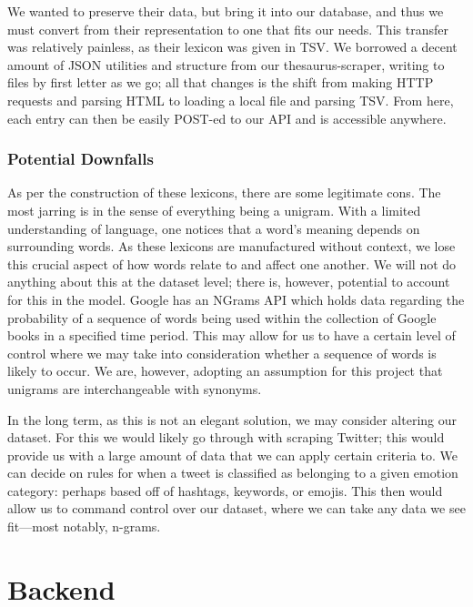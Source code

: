 \documentclass[11pt, twoside, reqno]{book}
\begin{document}
We wanted to preserve their data, but bring it into our database, and thus we must convert from their representation to one that fits our needs. This transfer was relatively painless, as their lexicon was given in TSV. We borrowed a decent amount of JSON utilities and structure from our thesaurus-scraper, writing to files by first letter as we go; all that changes is the shift from making HTTP requests and parsing HTML to loading a local file and parsing TSV. From here, each entry can then be easily POST-ed to our API and is accessible anywhere.

\subsection{Potential Downfalls}

As per the construction of these lexicons, there are some legitimate cons. The most jarring is in the sense of everything being a unigram. With a limited understanding of language, one notices that a word's meaning depends on surrounding words. As these lexicons are manufactured without context, we lose this crucial aspect of how words relate to and affect one another. We will not do anything about this at the dataset level; there is, however, potential to account for this in the model. Google has an NGrams API which holds data regarding the probability of a sequence of words being used within the collection of Google books in a specified time period. This may allow for us to have a certain level of control where we may take into consideration whether a sequence of words is likely to occur. We are, however, adopting an assumption for this project that unigrams are interchangeable with synonyms.

In the long term, as this is not an elegant solution, we may consider altering our dataset. For this we would likely go through with scraping Twitter; this would provide us with a large amount of data that we can apply certain criteria to. We can decide on rules for when a tweet is classified as belonging to a given emotion category: perhaps based off of hashtags, keywords, or emojis. This then would allow us to command control over our dataset, where we can take any data we see fit—most notably, n-grams.








\chapter{Backend}
\end{document}
